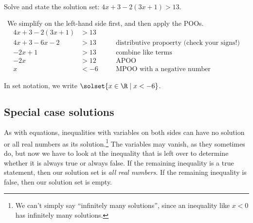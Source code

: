 \begin{boxedex}
Solve and state the solution set: $4x+3-2(3x + 1) > 13$.

\exsoln\ We simplify on the left-hand side first, and then apply the POOs.
\[\begin{aligned}
4x+3-2(3x + 1)	&> 13
&& \quad\text{}\\
4x+3-6x-2		&> 13
&& \quad\text{distributive propoerty (check your signs!)}\\
-2x+1			&> 13
&& \quad\text{combine like terms}\\
-2x				&> 12
&& \quad\text{APOO}\\
x				&< -6
&& \quad\text{MPOO with a negative number}
\end{aligned}\]

In set notation, we write $\solset{x \in \R \mid x < -6}$.
\end{boxedex}

%
%
%

\subsection{Special case solutions}

As with equations, inequalities with variables on both sides can have no solution or all real numbers as its solution.\footnote{We can't simply say ``infinitely many solutions'', since an inequality like $x<0$ has infinitely many solutions.} The variables may vanish, as they sometimes do, but now we have to look at the inequality that is left over to determine whether it is always true or always false. If the remaining inequality is a true statement, then our solution set is \textit{all real numbers}. If the remaining inequality is false, then our solution set is empty.

